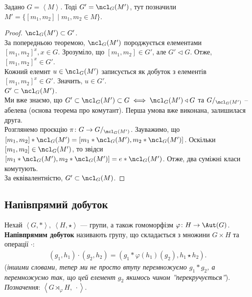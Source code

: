 \documentclass{math_library}
\begin{document}
\begin{theorem}
Задано $G = \left< M \right>$. Тоді $G' = \ncl_G(M')$, тут позначили \\
$M' = \{ [m_1,m_2] \mid m_1,m_2 \in M\}$.
\end{theorem}

\begin{proof}
$\ncl_G(M') \subset G'$.\\
За попередньою теоремою, $\ncl_G(M')$ породжується елементами $[m_1,m_2]^x, x \in G$. Зрозуміло, що $[m_1,m_2] \in G'$, але $G' \triangleleft G$. Отже, $[m_1,m_2]^x \in G'$.\\
Кожний елемнт $u \in \ncl_G(M')$ записується як добуток з елементів $[m_1,m_2]^x \in G'$. Значить, $u \in G'$.
\bigskip \\
$G' \subset \ncl_G(M')$.\\
Ми вже знаємо, що $G' \subset \ncl_G(M') \subset G \iff \ncl_G(M') \triangleleft G$ та $G/_{\ncl_G(M')}$ -- абелева (основа теорема про комутант). Перша умова вже виконана, залишилася друга.\\
Розглянемо проєкцію $\pi \colon G \to G/_{\ncl_G(M')}$. Зауважимо, що\\
$[m_1,m_2]*\ncl_G(M') = [m_1*\ncl_G(M'),m_2*\ncl_G(M')]$. Оскільки $[m_1,m_2] \in \ncl_G(M')$, то звідси $[m_1*\ncl_G(M'),m_2*\ncl_G(M')] = e*\ncl_G(M')$. Отже, два суміжні класи комутують.\\
За еквівалентністю, $G' \subset \ncl_G(M)$.
\end{proof}

\subsection{Напівпрямий добуток}
\begin{definition}
Нехай $\left<G,*\right>,\ \left<H, \star\right>$ --- групи, а також гомоморфізм $\varphi \colon H \to \Aut(G)$.\\
\textbf{Напівпрямим добуток} називають групу, що складається з множини $G \times H$ та операції $\cdot$:
\begin{align*}
(g_1,h_1) \cdot (g_2,h_2) = (g_1*\varphi(h_1)(g_2), h_1 \star h_2).
\end{align*}
(\textit{іншими словами, тепер ми не просто втупу перемножуємо $g_1*g_2$, а перемножуємо так, що цей елемент $g_2$ якимось чином ''перекручується''}).\\
\textit{Позначення}: $\left<G \rtimes_\varphi H,\ \cdot\right>$.
\end{definition}
\end{document}
